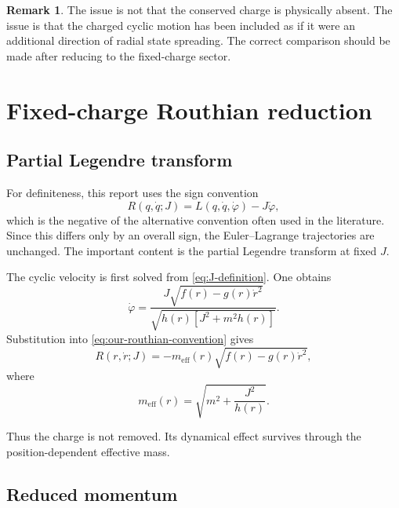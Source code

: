 \documentclass[11pt,a4paper]{article}
\theoremstyle{plain}
\theoremstyle{definition}
\newtheorem{remark}[proposition]{Remark}
\theoremstyle{remark}
\newcommand{\meff}{m_{\mathrm{eff}}}
\begin{document}
\begin{remark}
The issue is not that the conserved charge is physically absent. The issue is that the charged cyclic motion has been included as if it were an additional direction of radial state spreading. The correct comparison should be made after reducing to the fixed-charge sector.
\end{remark}

\section{Fixed-charge Routhian reduction}
\label{sec:routhian}

\subsection{Partial Legendre transform}

For definiteness, this report uses the sign convention
\begin{equation}
\boxed{
R(q,\dot q;J)
=
L(q,\dot q,\dot\varphi)-J\dot\varphi,
}
\label{eq:our-routhian-convention}
\end{equation}
which is the negative of the alternative convention often used in the literature. Since this differs only by an overall sign, the Euler--Lagrange trajectories are unchanged. The important content is the partial Legendre transform at fixed $J$.

The cyclic velocity is first solved from \eqref{eq:J-definition}. One obtains
\begin{equation*}
\dot\varphi
=
\frac{
J\sqrt{f(r)-g(r)\dot r^2}
}{
\sqrt{
h(r)\left[J^2+m^2h(r)\right]
}
}.
\end{equation*}
Substitution into \eqref{eq:our-routhian-convention} gives
\begin{equation}
R(r,\dot r;J)
=
-\meff(r)
\sqrt{f(r)-g(r)\dot r^2},
\label{eq:reduced-routhian}
\end{equation}
where
\begin{equation*}
\boxed{
\meff(r)
=
\sqrt{
m^2+\frac{J^2}{h(r)}
}.
}
\end{equation*}

Thus the charge is not removed. Its dynamical effect survives through the position-dependent effective mass.

\subsection{Reduced momentum}
\end{document}
